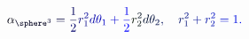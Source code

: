 \documentclass[12pt]{article}
\begin{document}
\makeatletter
\renewcommand*{\@textcolor}[3]{%
  \protect\leavevmode
  \begingroup
    \color#1{#2}#3%
  \endgroup
}
\makeatother
\begin{displaymath}
\mathcolor[RGB]{0,0,15}{\alpha} _ { \mathcolor[RGB]{0,0,30}{\sphere} ^ { \mathcolor[RGB]{0,0,45}{3} } } \mathcolor[RGB]{0,0,60}{=} \mathcolor[RGB]{0,0,75}{\frac { \mathcolor[RGB]{0,0,90}{1} } { \mathcolor[RGB]{0,0,105}{2} } } \mathcolor[RGB]{0,0,120}{r} _ { \mathcolor[RGB]{0,0,135}{1} } ^ { \mathcolor[RGB]{0,0,150}{2} } \mathcolor[RGB]{0,0,165}{d} \mathcolor[RGB]{0,0,180}{\theta} _ { \mathcolor[RGB]{0,0,195}{1} } \mathcolor[RGB]{0,0,210}{+} \mathcolor[RGB]{0,0,225}{\frac { \mathcolor[RGB]{0,0,240}{1} } { \mathcolor[RGB]{0,0,255}{2} } } \mathcolor[RGB]{0,15,0}{r} _ { \mathcolor[RGB]{0,15,15}{2} } ^ { \mathcolor[RGB]{0,15,30}{2} } \mathcolor[RGB]{0,15,45}{d} \mathcolor[RGB]{0,15,60}{\theta} _ { \mathcolor[RGB]{0,15,75}{2} } \mathcolor[RGB]{0,15,90}{,} \quad \mathcolor[RGB]{0,15,105}{r} _ { \mathcolor[RGB]{0,15,120}{1} } ^ { \mathcolor[RGB]{0,15,135}{2} } \mathcolor[RGB]{0,15,150}{+} \mathcolor[RGB]{0,15,165}{r} _ { \mathcolor[RGB]{0,15,180}{2} } ^ { \mathcolor[RGB]{0,15,195}{2} } \mathcolor[RGB]{0,15,210}{=} \mathcolor[RGB]{0,15,225}{1} \mathcolor[RGB]{0,15,240}{.}
\end{displaymath}
\end{document}
